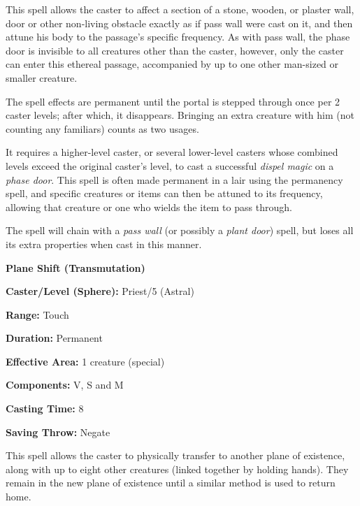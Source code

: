 \begin{multicols}{2}
This spell allows the caster to affect a section of a stone, wooden, or plaster wall, door or other non-living obstacle exactly as if pass wall were cast on it, and then attune his body to the passage's specific frequency.  As with pass wall, the phase door is invisible to all creatures other than the caster, however, only the caster can enter this ethereal passage, accompanied by up to one other man-sized or smaller creature.  

The spell effects are permanent until the portal is stepped through once per 2 caster levels; after which, it disappears.  Bringing an extra creature with him (not counting any familiars) counts as two usages.    

It requires a higher-level caster, or several lower-level casters whose combined levels exceed the original caster's level, to cast a successful \textit{dispel magic} on a \textit{phase door}.  This spell is often made permanent in a lair using the permanency spell, and specific creatures or items can then be attuned to its frequency, allowing that creature or one who wields the item to pass through.

The spell will chain with a \textit{pass wall} (or possibly a \textit{plant door}) spell, but loses all its extra properties when cast in this manner. 

\vspace{1em}

\noindent
\begin{minipage}{\columnwidth}

\noindent \textbf{Plane Shift (Transmutation)}

\noindent \textbf{Caster/Level (Sphere):} Priest/5 (Astral)

\noindent \textbf{Range:} Touch

\noindent \textbf{Duration:} Permanent

\noindent \textbf{Effective Area:} 1 creature (special)

\noindent \textbf{Components:} V, S and M

\noindent \textbf{Casting Time:} 8

\noindent \textbf{Saving Throw:} Negate

\end{minipage}

This spell allows the caster to physically transfer to another plane of existence, along with up to eight other creatures (linked together by holding hands).  They remain in the new plane of existence until a similar method is used to return home.


\end{multicols}

